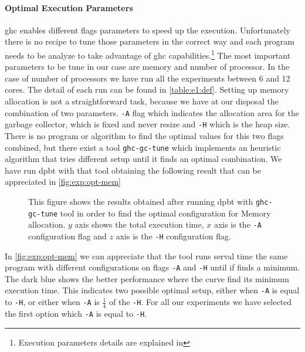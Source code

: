 \paragraph{Optimal Execution Parameters}\label{par:ex:param} \acrshort{ghc} enables different flags parameters to speed up the execution. Unfortunately there is no recipe to tune those parameters in the correct way and each program needs to be analyze to take advantage of \acrshort{ghc} capabilities.\footnote{Execution parameters details are explained in }
The most important parameters to be tune in our case are memory and number of processor. In the case of number of processors we have run all the experiments between 6 and 12 cores. The detail of each run can be found in \autoref{table:e1:def}.
Setting up memory allocation is not a straightforward task, because we have at our disposal the combination of two parameters. \texttt{-A} flag which indicates the allocation area for the garbage collector, which is fixed and never resize and \texttt{-H} which is the heap size. There is no program or algorithm to find the optimal values for this two flags combined, but there exist a tool \texttt{ghc-gc-tune} \cite{ghctune} 
which implements an heuristic algorithm that tries different setup until it finds an optimal combination.
We have run \acrshort{dpbt} with that tool obtaining the following result that can be appreciated in \autoref{fig:exp:opt-mem}

\begin{figure}[h!]
  \centering  
\caption[$\dpbt$ Finding Optimal Memory Setup]{This figure shows the results obtained after running \acrshort{dpbt} with \texttt{ghc-gc-tune} tool in order to find the optimal configuration for Memory allocation. $y$ axis shows the total execution time, $x$ axis is the \texttt{-A} configuration flag and $z$ axis is the \texttt{-H} configuration flag.}
\label{fig:exp:opt-mem}
\end{figure}

In \autoref{fig:exp:opt-mem} we can appreciate that the tool runs serval time the same program with different configurations on flags \texttt{-A} and \texttt{-H} until if finds a minimum. The dark blue shows the better performance where the curve find its minimum execution time. 
This indicates two possible optimal setup, either when \texttt{-A} is equal to \texttt{-H}, or either when \texttt{-A} is $\frac{1}{4}$ of the \texttt{-H}. For all our experiments we have selected the first option which \texttt{-A} is equal to \texttt{-H}.

